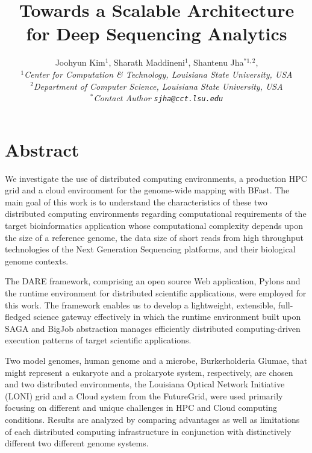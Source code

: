\documentclass[12pt]{article}
\begin{document}
\title{Towards a Scalable Architecture for Deep Sequencing Analytics}

\author{Joohyun Kim$^{1}$, Sharath Maddineni$^{1}$, Shantenu Jha$^{*1,2}$, \\
  \small{\emph{$^{1}$Center for Computation \& Technology, Louisiana State University, USA}}\\
  \small{\emph{$^{2}$Department of Computer Science, Louisiana State University, USA}}\\
  \small{\emph{$^{*}$Contact Author \texttt{sjha@cct.lsu.edu}}}
  }


\maketitle

\section*{Abstract}

We investigate the use of distributed computing environments, a
production HPC grid and a cloud environment for the genome-wide
mapping with BFast.  The main goal of this work is to understand
the characteristics of these two distributed computing environments
regarding computational requirements of the target bioinformatics
application whose computational complexity depends upon the size of a
reference genome, the data size of short reads from high throughput
technologies of the Next Generation Sequencing platforms, and their
biological genome contexts.

The DARE framework, comprising an open source Web application, Pylons
and the runtime environment for distributed scientific applications,
were employed for this work.  The framework enables us to develop a
lightweight, extensible, full-fledged science gateway effectively in
which the runtime environment built upon SAGA and BigJob abstraction
manages efficiently distributed computing-driven execution patterns of
target scientific applications.

Two model genomes, human genome and a microbe, Burkerholderia Glumae,
that might represent a eukaryote and a prokaryote system,
respectively, are chosen and two distributed environments, the
Louisiana Optical Network Initiative (LONI) grid and a Cloud system
from the FutureGrid, were used primarily focusing on different and
unique challenges in HPC and Cloud computing conditions.  Results are
analyzed by comparing advantages as well as limitations of each
distributed computing infrastructure in conjunction with distinctively
different two different genome systems.
\end{document}
